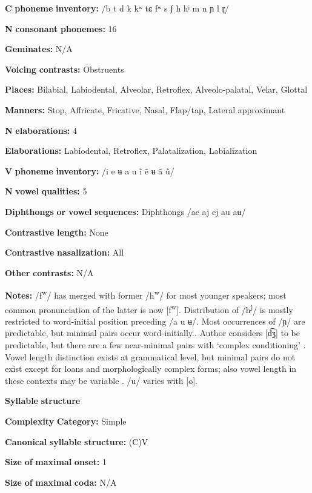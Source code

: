 \begin{styleBody}
\textbf{C} \textbf{phoneme} \textbf{inventory:} /b t d k kʷ tɕ fʷ s ʃ h hʲ m n ɲ l ɽ/

\textbf{N} \textbf{consonant} \textbf{phonemes:} 16

\textbf{Geminates:} N/A

\textbf{Voicing} \textbf{contrasts:} Obstruents

\textbf{Places:} Bilabial, Labiodental, Alveolar, Retroflex, Alveolo-palatal, Velar, Glottal

\textbf{Manners:} Stop, Affricate, Fricative, Nasal, Flap/tap, Lateral approximant

\textbf{N} \textbf{elaborations:} 4

\textbf{Elaborations:} Labiodental, Retroflex, Palatalization, Labialization

\textbf{V} \textbf{phoneme} \textbf{inventory:} /i e ʉ a u ĩ ẽ ʉ ã ũ/

\textbf{N} \textbf{vowel} \textbf{qualities:} 5

\textbf{Diphthongs} \textbf{or} \textbf{vowel} \textbf{sequences:} Diphthongs /ae aj ej au aʉ/

\textbf{Contrastive} \textbf{length:} None

\textbf{Contrastive} \textbf{nasalization:} All

\textbf{Other} \textbf{contrasts:} N/A

\textbf{Notes:} /f\textsuperscript{w}/ has merged with former /h\textsuperscript{w}/ for most younger speakers; most common pronunciation of the latter is now [f\textsuperscript{w}]. Distribution of /h\textsuperscript{j}/ is mostly restricted to word-initial position preceding /a u ʉ/. Most occurrences of /ɲ/ are predictable, but minimal pairs occur word-initially.. Author considers [d͡ʒ] to be predictable, but there are a few near-minimal pairs with ‘complex conditioning’ \citep[30-49]{Olawsky2006}. Vowel length distinction exists at grammatical level, but minimal pairs do not exist except for loans and morphologically complex forms; also vowel length in these contexts may be variable \citep[56-7]{Olawsky2006}. /u/ varies with [o].

\textbf{Syllable} \textbf{structure}

\textbf{Complexity} \textbf{Category:} Simple

\textbf{Canonical} \textbf{syllable} \textbf{structure:} (C)V \citep[75-6]{Olawsky2006}

\textbf{Size} \textbf{of} \textbf{maximal} \textbf{onset:} 1

\textbf{Size} \textbf{of} \textbf{maximal} \textbf{coda:} N/A


\end{styleBody}
